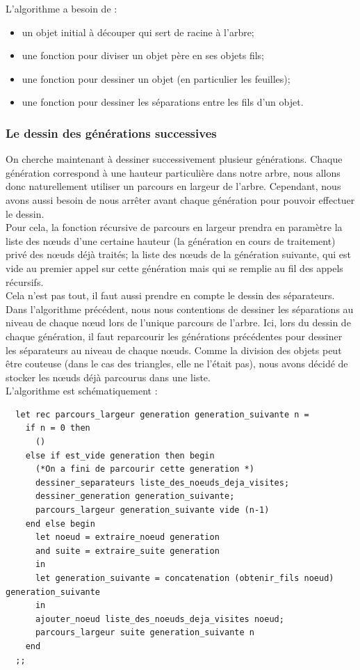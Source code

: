\documentclass[a4paper,11pt]{article}
\begin{document}
L'algorithme a besoin de :
\begin{itemize}
  \item un objet initial à découper qui sert de racine à l'arbre;
  \item une fonction pour diviser un objet père en ses objets fils;
  \item une fonction pour dessiner un objet (en particulier les feuilles);
  \item une fonction pour dessiner les séparations entre les fils d'un objet.
\end{itemize}

\subsubsection{Le dessin des générations successives}
On cherche maintenant à dessiner successivement plusieur générations. Chaque génération
correspond à une hauteur particulière dans notre arbre, nous allons donc naturellement
utiliser un parcours en largeur de l'arbre. Cependant, nous avons aussi besoin de nous
arrêter avant chaque génération pour pouvoir effectuer le dessin.\\

Pour cela, la fonction récursive de parcours en largeur prendra en paramètre la liste des
nœuds d'une certaine hauteur (la génération en cours de traitement) privé des nœuds déjà
traités; la liste des nœuds de la génération suivante, qui est vide au premier appel sur
cette génération mais qui se remplie au fil des appels récursifs.\\

Cela n'est pas tout, il faut aussi prendre en compte le dessin des séparateurs. Dans
l'algorithme précédent, nous nous contentions de dessiner les séparations au niveau de chaque
nœud lors de l'unique parcours de l'arbre. Ici, lors du dessin de chaque génération, il
faut reparcourir les générations précédentes pour dessiner les séparateurs au niveau de
chaque nœuds. Comme la division des objets peut être couteuse (dans le cas des triangles, elle
ne l'était pas), nous avons décidé de stocker les nœuds déjà parcourus dans une liste.\\

L'algorithme est schématiquement :

\begin{lstlisting}
  let rec parcours_largeur generation generation_suivante n =
    if n = 0 then
      ()
    else if est_vide generation then begin
      (*On a fini de parcourir cette generation *)
      dessiner_separateurs liste_des_noeuds_deja_visites;
      dessiner_generation generation_suivante;
      parcours_largeur generation_suivante vide (n-1)
    end else begin
      let noeud = extraire_noeud generation
      and suite = extraire_suite generation
      in
      let generation_suivante = concatenation (obtenir_fils noeud) generation_suivante
      in
      ajouter_noeud liste_des_noeuds_deja_visites noeud;
      parcours_largeur suite generation_suivante n
    end
  ;;
\end{lstlisting}
\end{document}
